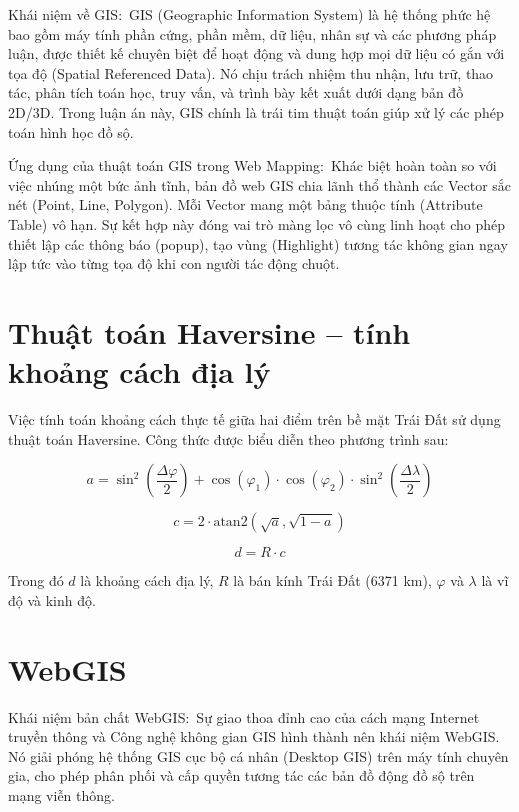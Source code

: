 \documentclass[13pt,a4paper]{report}
\begin{document}
Khái niệm về GIS: GIS (Geographic Information System) là hệ thống phức hệ bao gồm máy tính phần cứng, phần mềm, dữ liệu, nhân sự và các phương pháp luận, được thiết kế chuyên biệt để hoạt động và dung hợp mọi dữ liệu có gắn với tọa độ (Spatial Referenced Data). Nó chịu trách nhiệm thu nhận, lưu trữ, thao tác, phân tích toán học, truy vấn, và trình bày kết xuất dưới dạng bản đồ 2D/3D. Trong luận án này, GIS chính là trái tim thuật toán giúp xử lý các phép toán hình học đồ sộ.

Ứng dụng của thuật toán GIS trong Web Mapping: Khác biệt hoàn toàn so với việc nhúng một bức ảnh tĩnh, bản đồ web GIS chia lãnh thổ thành các Vector sắc nét (Point, Line, Polygon). Mỗi Vector mang một bảng thuộc tính (Attribute Table) vô hạn. Sự kết hợp này đóng vai trò màng lọc vô cùng linh hoạt cho phép thiết lập các thông báo (popup), tạo vùng (Highlight) tương tác không gian ngay lập tức vào từng tọa độ khi con người tác động chuột.

\section{Thuật toán Haversine – tính khoảng cách địa lý}

Việc tính toán khoảng cách thực tế giữa hai điểm trên bề mặt Trái Đất sử dụng thuật toán Haversine. Công thức được biểu diễn theo phương trình sau:

\begin{equation}
    a = \sin^2\left(\frac{\Delta \varphi}{2}\right) + \cos(\varphi_1) \cdot \cos(\varphi_2) \cdot \sin^2\left(\frac{\Delta \lambda}{2}\right)
\end{equation}

\begin{equation}
    c = 2 \cdot \text{atan2}\left(\sqrt{a}, \sqrt{1-a}\right)
\end{equation}

\begin{equation}
    d = R \cdot c
\end{equation}

Trong đó $d$ là khoảng cách địa lý, $R$ là bán kính Trái Đất (6371 km), $\varphi$ và $\lambda$ là vĩ độ và kinh độ.
\section{WebGIS}

Khái niệm bản chất WebGIS: Sự giao thoa đỉnh cao của cách mạng Internet truyền thông và Công nghệ không gian GIS hình thành nên khái niệm WebGIS. Nó giải phóng hệ thống GIS cục bộ cá nhân (Desktop GIS) trên máy tính chuyên gia, cho phép phân phối và cấp quyền tương tác các bản đồ động đồ sộ trên mạng viễn thông.
\end{document}
